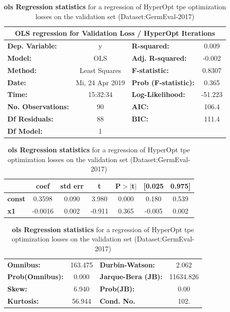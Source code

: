 \begin{table}[H]
    \begin{center}
        \begin{tabular}{lclc}
        \toprule
        \multicolumn{4}{c}{OLS regression for Validation Loss / HyperOpt Iterations} \\
        \midrule
        \textbf{Dep. Variable:}    &        y        & \textbf{  R-squared:        } &     0.009   \\
        \textbf{Model:}            &       OLS       & \textbf{  Adj. R-squared:   } &    -0.002   \\
        \textbf{Method:}           &  Least Squares  & \textbf{  F-statistic:      } &    0.8307   \\
        \textbf{Date:}             & Mi, 24 Apr 2019 & \textbf{  Prob (F-statistic):} &    0.365    \\
        \textbf{Time:}             &     15:32:34    & \textbf{  Log-Likelihood:   } &   -51.223   \\
        \textbf{No. Observations:} &          90     & \textbf{  AIC:              } &     106.4   \\
        \textbf{Df Residuals:}     &          88     & \textbf{  BIC:              } &     111.4   \\
        \textbf{Df Model:}         &           1     & \textbf{                     } &             \\
        \bottomrule
        \end{tabular}
        \begin{tabular}{lcccccc}
                       & \textbf{coef} & \textbf{std err} & \textbf{t} & \textbf{P$>$$|$t$|$} & \textbf{[0.025} & \textbf{0.975]}  \\
        \midrule
        \textbf{const} &       0.3598  &        0.090     &     3.980  &         0.000        &        0.180    &        0.539     \\
        \textbf{x1}    &      -0.0016  &        0.002     &    -0.911  &         0.365        &       -0.005    &        0.002     \\
        \bottomrule
        \end{tabular}
        \begin{tabular}{lclc}
        \textbf{Omnibus:}       & 163.475 & \textbf{  Durbin-Watson:    } &     2.062  \\
        \textbf{Prob(Omnibus):} &   0.000 & \textbf{  Jarque-Bera (JB): } & 11634.826  \\
        \textbf{Skew:}          &   6.940 & \textbf{  Prob(JB):         } &      0.00  \\
        \textbf{Kurtosis:}      &  56.944 & \textbf{  Cond. No.          } &      102.  \\
        \bottomrule
        \end{tabular}
    \end{center}
    \caption{\textbf{\gls{ols} Regression statistics} for a regression of HyperOpt \gls{tpe} optimization losses on the validation set {(Dataset:GermEval-2017)}}
    \label{tab:08_olsLossItVal}    
\end{table}

